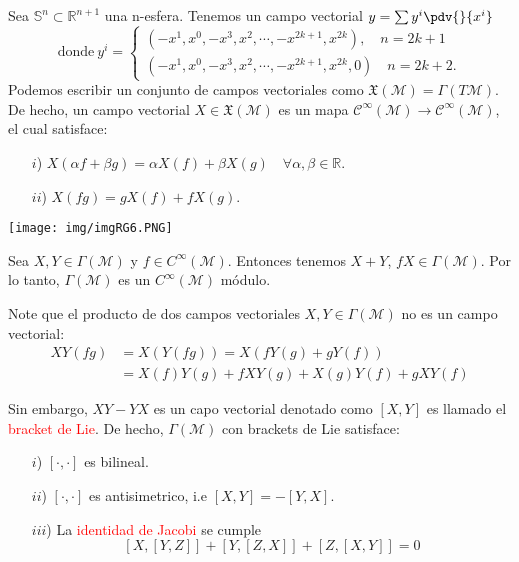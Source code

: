 \documentclass[../main]{subfiles}
\begin{document}
\ejemplo{} Sea $\mathbb{S}^n \subset \mathbb{R}^{n+1}$ una n-esfera. Tenemos un campo vectorial $y=\sum y^{i}\pdv{}{x^{i}}$
\begin{equation}
    \text{donde} \ y^{i}=
    \left\{
    \begin{matrix}
        (-x^1, x^0, -x^3, x^2, \cdots, -x^{2k+1}, x^{2k}), \quad n=2k+1\\
        (-x^1, x^0, -x^3, x^2, \cdots, -x^{2k+1}, x^{2k}, 0) \quad n=2k+2.
    \end{matrix}
    \right.
\end{equation}
Podemos escribir un conjunto de campos vectoriales como $\mathfrak{X}(\mathcal{M})=\Gamma (T\mathcal{M})$. De hecho, un campo vectorial $X \in \mathfrak{X}(\mathcal{M})$ es un mapa $\mathcal{C}^{\infty}(\mathcal{M})\rightarrow \mathcal{C}^{\infty}(\mathcal{M})$, el cual satisface:
\begin{enumerate}
    \item[$i$)] $X(\alpha f+\beta g)=\alpha X(f)+\beta X(g)\quad \forall \alpha, \beta \in \mathbb{R}$.\\
    \item[$ii$)] $X(fg)=gX(f)+fX(g)$.  
\end{enumerate}


\begin{center}
\texttt{[image: img/imgRG6.PNG]}
\end{center}

Sea $X, Y \in \Gamma(\mathcal{M})$ y $f\in C^{\infty}(\mathcal{M})$. Entonces tenemos $X+Y$, $fX \in \Gamma(\mathcal{M})$. Por lo tanto, $\Gamma(\mathcal{M})$ es un $C^{\infty}(\mathcal{M})$ módulo.

Note que el producto de dos campos vectoriales $X, Y \in \Gamma(\mathcal{M})$ no es un campo vectorial:
\begin{equation}
    \begin{split}
        XY(fg)&=X\left(Y(fg)\right)=X\left(fY(g)+gY(f)\right)\\
        &=X(f)Y(g)+fXY(g)+X(g)Y(f)+gXY(f)
    \end{split}
\end{equation}

Sin embargo, $XY-YX$ es un capo vectorial denotado como $[X, Y]$ es llamado el \textcolor{red}{bracket de Lie}. De hecho, $\Gamma(\mathcal{M})$ con brackets de Lie satisface:
\begin{enumerate}
    \item[$i$)]  $[\cdot, \cdot]$ es bilineal.
    \item[$ii$)] $[\cdot, \cdot]$ es antisimetrico, i.e $[X, Y]=-[Y, X]$.
    \item[$iii$)] La \textcolor{red}{identidad de Jacobi} se cumple 
    \begin{equation*}
        \left[X, [Y, Z]\right]+\left[Y, [Z, X]\right]+\left[Z, [X, Y]\right]=0
    \end{equation*}
\end{enumerate}
\end{document}
